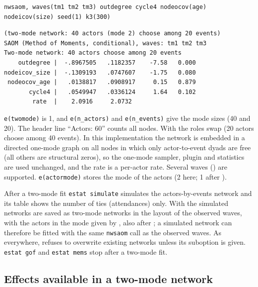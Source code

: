 \begin{lstlisting}
nwsaom, waves(tm1 tm2 tm3) outdegree cycle4 nodeocov(age) nodeicov(size) seed(1) k3(300)
\end{lstlisting}
\begin{lstlisting}
(two-mode network: 40 actors (mode 2) choose among 20 events)
SAOM (Method of Moments, conditional), waves: tm1 tm2 tm3
Two-mode network: 40 actors choose among 20 events
    outdegree |  -.8967505   .1182357    -7.58   0.000
nodeicov_size |  -.1309193   .0747607    -1.75   0.080
 nodeocov_age |   .0138817   .0908917     0.15   0.879
       cycle4 |   .0549947   .0336124     1.64   0.102
        rate  |    2.0916     2.0732
\end{lstlisting}
\texttt{e(twomode)} is 1, and \texttt{e(n\_actors)} and \texttt{e(n\_events)} give the mode sizes (40 and 20). The header line ``Actors: 60'' counts all nodes. With  the roles swap (20 actors choose among 40 events). In this implementation the network is embedded in a directed one-mode graph on all nodes in which only actor-to-event dyads are free (all others are structural zeros), so the one-mode sampler, plugin and statistics are used unchanged, and the rate is a per-actor rate. Several waves () are supported. \texttt{e(actormode)} stores the mode of the actors (2 here; 1 after ).

After a two-mode fit \texttt{estat simulate} simulates the actors-by-events network and its table shows the number of ties (attendances) only. With  the simulated networks are saved as two-mode networks in the layout of the observed waves, with the actors in the mode given by , also after ; a simulated network can therefore be fitted with the same \texttt{nwsaom} call as the observed waves. As everywhere,  refuses to overwrite existing networks unless its  suboption is given. \texttt{estat gof} and \texttt{estat mems} stop after a two-mode fit.

\subsection{Effects available in a two-mode network}

